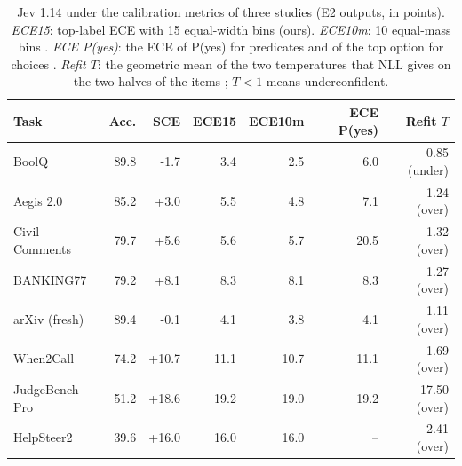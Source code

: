 \begin{table}[t]
\centering
\scriptsize
\setlength{\tabcolsep}{2pt}
\begin{tabular}{@{}lrrrrrr@{}}
\toprule
Task & Acc. & SCE & ECE15 & ECE10m & ECE P(yes) & Refit $T$ \\
\midrule
BoolQ & 89.8 & -1.7 & 3.4 & 2.5 & 6.0 & 0.85 (under) \\
Aegis 2.0 & 85.2 & +3.0 & 5.5 & 4.8 & 7.1 & 1.24 (over) \\
Civil Comments & 79.7 & +5.6 & 5.6 & 5.7 & 20.5 & 1.32 (over) \\
BANKING77 & 79.2 & +8.1 & 8.3 & 8.1 & 8.3 & 1.27 (over) \\
arXiv (fresh) & 89.4 & -0.1 & 4.1 & 3.8 & 4.1 & 1.11 (over) \\
When2Call & 74.2 & +10.7 & 11.1 & 10.7 & 11.1 & 1.69 (over) \\
JudgeBench-Pro & 51.2 & +18.6 & 19.2 & 19.0 & 19.2 & 17.50 (over) \\
HelpSteer2 & 39.6 & +16.0 & 16.0 & 16.0 & -- & 2.41 (over) \\
\bottomrule
\end{tabular}
\caption{Jev 1.14 under the calibration metrics of three studies (E2 outputs, in points). \emph{ECE15}: top-label ECE with 15 equal-width bins (ours). \emph{ECE10m}: 10 equal-mass bins \citep{rafe2026benchmarking}. \emph{ECE P(yes)}: the ECE of P(yes) for predicates and of the top option for choices \citep{deusser2026evaluating}. \emph{Refit $T$}: the geometric mean of the two temperatures that NLL gives on the two halves of the items \citep{sharma2026typedbench}; $T<1$ means underconfident.}
\label{tab:app-metrics}
\end{table}
